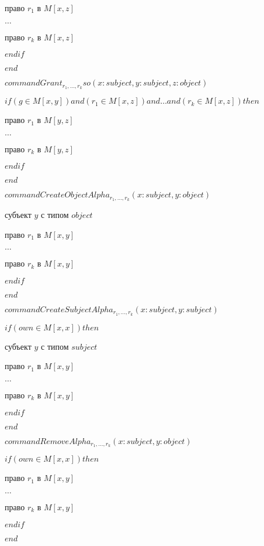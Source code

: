 		 право $r_1$ в $M[x,z]$

		$\ldots$

		 право $r_k$ в $M[x,z]$

		$endif$

		$end$



		$command  Grant_{r_1, \ldots, r_k}so(x: subject,y:subject,z:object)$

		$if (g \in M[x,y]) and (r_1 \in M[x,z]) and  \ldots and (r_k \in M[x,z]) then $

		 право $r_1$ в $M[y,z]$

		$\ldots$

		 право $r_k$ в $M[y,z]$

		$endif$

		$end$


		$command  CreateObjectAlpha_{r_1, \ldots, r_k}(x: subject,y:object)$


		 субъект $y$ с типом $object$

		 право $r_1$ в $M[x,y]$

		$\ldots$

		 право $r_k$ в $M[x,y]$

		$endif$

		$end$



		$command  CreateSubjectAlpha_{r_1, \ldots, r_k}(x: subject,y:subject)$

		$if (own \in M[x,x]) then $

		 субъект $y$ с типом $subject$

		 право $r_1$ в $M[x,y]$

		$\ldots$

		 право $r_k$ в $M[x,y]$

		$endif$

		$end$



		$command  RemoveAlpha_{r_1, \ldots, r_k}(x: subject,y:object)$

		$if (own \in M[x,x]) then $

		 право $r_1$ в $M[x,y]$

		$\ldots$

		 право $r_k$ в $M[x,y]$

		$endif$

		$end$
		\newpage
